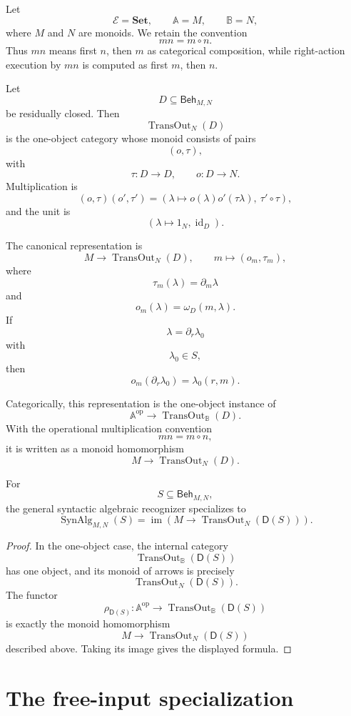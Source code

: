 Let
\[
\mathcal E=\mathbf{Set},
\qquad
\mathbb A=M,
\qquad
\mathbb B=N,
\]
where \(M\) and \(N\) are monoids. We retain the convention
\[
mn=m\circ n.
\]
Thus \(mn\) means first \(n\), then \(m\) as categorical composition, while
right-action execution by \(mn\) is computed as first \(m\), then \(n\).

Let
\[
D\subseteq\mathsf{Beh}_{M,N}
\]
be residually closed. Then
\[
\operatorname{TransOut}_{N}(D)
\]
is the one-object category whose monoid consists of pairs
\[
(o,\tau),
\]
with
\[
\tau:D\to D,
\qquad
o:D\to N.
\]
Multiplication is
\[
(o,\tau)(o',\tau')
=
\left(
\lambda\mapsto o(\lambda)o'(\tau\lambda),
\ \tau'\circ\tau
\right),
\]
and the unit is
\[
(\lambda\mapsto 1_N,\operatorname{id}_D).
\]

The canonical representation is
\[
M\to \operatorname{TransOut}_N(D),
\qquad
m\longmapsto(o_m,\tau_m),
\]
where
\[
\tau_m(\lambda)=\partial_m\lambda
\]
and
\[
o_m(\lambda)=\omega_D(m,\lambda).
\]
If
\[
\lambda=\partial_r\lambda_0
\]
with
\[
\lambda_0\in S,
\]
then
\[
o_m(\partial_r\lambda_0)=\lambda_0(r,m).
\]

Categorically, this representation is the one-object instance of
\[
\mathbb A^{\mathrm{op}}
\to
\operatorname{TransOut}_{\mathbb B}(D).
\]
With the operational multiplication convention
\[
mn=m\circ n,
\]
it is written as a monoid homomorphism
\[
M\to\operatorname{TransOut}_N(D).
\]

\begin{proposition}
\label{prop:reiterman-one-object-synalg}
For
\[
S\subseteq\mathsf{Beh}_{M,N},
\]
the general syntactic algebraic recognizer specializes to
\[
\operatorname{SynAlg}_{M,N}(S)
=
\operatorname{im}
\left(
M\to
\operatorname{TransOut}_N(\mathsf D(S))
\right).
\]
\end{proposition}

\begin{proof}
In the one-object case, the internal category
\[
\operatorname{TransOut}_{\mathbb B}(\mathsf D(S))
\]
has one object, and its monoid of arrows is precisely
\[
\operatorname{TransOut}_N(\mathsf D(S)).
\]
The functor
\[
\rho_{\mathsf D(S)}:
\mathbb A^{\mathrm{op}}\to
\operatorname{TransOut}_{\mathbb B}(\mathsf D(S))
\]
is exactly the monoid homomorphism
\[
M\to
\operatorname{TransOut}_N(\mathsf D(S))
\]
described above. Taking its image gives the displayed formula.
\end{proof}

\section{The free-input specialization}
\label{sec:reiterman-free-input-specialization}

